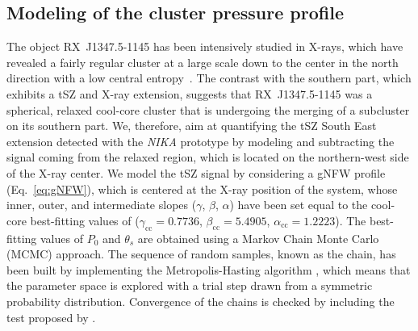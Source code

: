 \subsection{Modeling of the cluster pressure profile}
\label{sec:mcmc}
The object \mbox{RX~J1347.5-1145} has been intensively studied in \mbox{X-rays}, which have revealed a fairly regular cluster at a large scale down to the center in the north direction with a low central entropy~\citep{Cavagnolo2009}. The contrast with the southern part, which exhibits a tSZ and \mbox{X-ray} extension, suggests that \mbox{RX~J1347.5-1145} was a spherical, relaxed cool-core cluster that is undergoing the merging of a subcluster on its southern part. We, therefore, aim at quantifying the tSZ South East extension detected with the {\it NIKA} prototype by modeling and subtracting the signal coming from the relaxed region, which is located on the northern-west side of the \mbox{X-ray} center. We model the tSZ signal by considering a gNFW profile (Eq.~\ref{eq:gNFW}), which is centered at the \mbox{X-ray} position of the system, whose inner, outer, and intermediate slopes ($\gamma$, $\beta$, $\alpha$) have been set equal to the cool-core best-fitting values of \cite{arnaud_2010} ($\gamma_\mathrm{cc} = 0.7736$, $\beta_\mathrm{cc} = 5.4905$, $\alpha_\mathrm{cc} = 1.2223$). The best-fitting values of $P_{0}$ and $\theta_s$ are obtained using a Markov Chain Monte Carlo (MCMC) approach. The sequence of random samples, known as the chain, has been built by implementing the Metropolis-Hasting algorithm \citep{Greenbert95}, which means that the parameter space is explored with a trial step drawn from a symmetric probability distribution. Convergence of the chains is checked by including the test proposed by \cite{GelmanRubin1992}.

